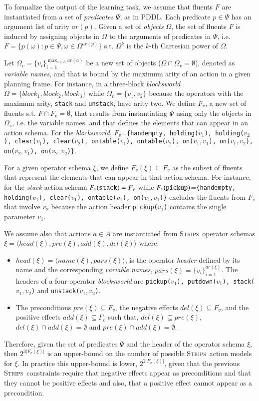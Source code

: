 \documentclass[3p,times]{elsarticle}
\newcommand{\strips}{\textsc{Strips}}     %
\newcommand{\tup}[1]{{\langle #1 \rangle}}
\begin{document}
To formalize the output of the learning task, we assume that fluents $F$ are instantiated from a set of {\em predicates} $\Psi$, as in PDDL. Each predicate $p\in\Psi$ has an argument list of arity $ar(p)$. Given a set of {\em objects} $\Omega$, the set of fluents $F$ is induced by assigning objects in $\Omega$ to the arguments of predicates in $\Psi$, i.e.~$F=\{p(\omega):p\in\Psi,\omega\in\Omega^{ar(p)}\}$ s.t. $\Omega^k$ is the $k$-th Cartesian power of $\Omega$.

Let $\Omega_v=\{v_i\}_{i=1}^{\operatorname*{max}_{a\in A} ar(a)}$ be a new set of objects ($\Omega\cap\Omega_v=\emptyset$), denoted as {\em variable names}, and that is bound by the maximum arity of an action in a given planning frame. For instance, in a three-block {\em blocksworld} $\Omega=\{block_1, block_2, block_3\}$ while $\Omega_v=\{v_1, v_2\}$ because the operators with the maximum arity, {\small\tt stack} and {\small\tt unstack}, have arity two. We define $F_v$, a new set of fluents s.t. $F\cap F_v=\emptyset$, that results from instantiating $\Psi$ using only the objects in $\Omega_v$, i.e. the variable names, and that defines the elements that can appear in an action schema. For the {\em blocksworld}, $F_v$={\small\tt\{handempty, holding($v_1$), holding($v_2$), clear($v_1$), clear($v_2$), ontable($v_1$), ontable($v_2$), on($v_1,v_1$), on($v_1,v_2$), on($v_2,v_1$), on($v_2,v_2$)\}}.

For a given operator schema $\xi$, we define $F_v(\xi)\subseteq F_v$ as the subset of fluents that represent the elements that can appear in that action schema. For instance, for the {\em stack} action schema $F_v({\tt stack})=F_v$ while $F_v({\tt pickup})$={\small\tt\{handempty, holding($v_1$), clear($v_1$), ontable($v_1$), on($v_1,v_1$)\}} excludes the fluents from $F_v$ that involve $v_2$ because the action header {\small\tt pickup($v_1$)} contains the single parameter $v_1$.

We assume also that actions $a\in A$ are instantiated from \strips\ operator schemas $\xi=\tup{head(\xi),pre(\xi),add(\xi),del(\xi)}$ where:
\begin{itemize}
\item $head(\xi)=\tup{name(\xi),pars(\xi)}$, is the operator {\em header} defined by its name and the corresponding {\em variable names}, $pars(\xi)=\{v_i\}_{i=1}^{ar(\xi)}$. The headers of a four-operator {\em blocksworld} are {\small\tt pickup($v_1$), putdown($v_1$), stack($v_1,v_2$)} and {\small\tt unstack($v_1,v_2$)}.
\item The preconditions $pre(\xi)\subseteq F_v$, the negative effects $del(\xi)\subseteq F_v$, and the positive effects $add(\xi)\subseteq F_v$ such that, $del(\xi)\subseteq pre(\xi)$, $del(\xi)\cap add(\xi)=\emptyset$ and $pre(\xi)\cap add(\xi)=\emptyset$.
\end{itemize}
Therefore, given the set of predicates $\Psi$ and the header of the operator schema $\xi$, then $2^{3|F_v(\xi)|}$ is an upper-bound on the number of possible \strips\ action models for $\xi$. In practice this upper-bound is lower, $2^{2|F_v(\xi)|}$, given that the previous \strips\ constraints require that negative effects appear as preconditions and that they cannot be positive effects and also, that a positive effect cannot appear as a precondition.
\end{document}
